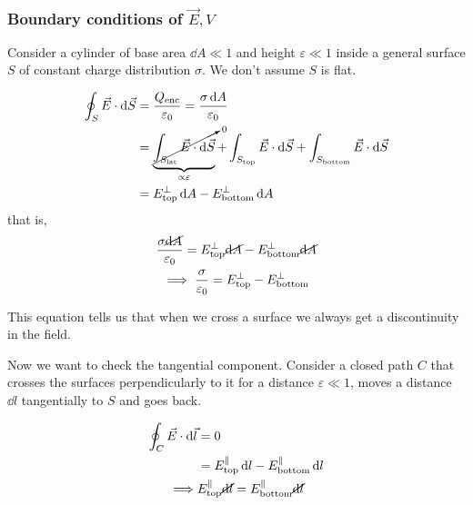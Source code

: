\documentclass[12pt]{extarticle}
\begin{document}
\subsubsection{Boundary conditions of \texorpdfstring{$\vec E, V$}{the electric field and the potential}}

Consider a cylinder of base area $\dd A \ll 1$ and height $ \varepsilon \ll 1$ inside a general surface $S$ of constant charge distribution $\sigma$.
We don't assume $S$ is flat.

\begin{align}
	\oint_S \vec E \cdot \dd{\vec S} & = \frac{Q_\text{enc}}{\varepsilon_0} = \frac{\sigma \dd{A}}{\varepsilon_0}                                                                                                                          \\
	                                 & = \underbrace{\cancelto{{}_0}{\int_{S_\text{lat}} \vec E \cdot \dd{\vec S}}}_{\propto \varepsilon} + \int_{S_\text{top}} \vec E \cdot \dd{\vec S} + \int_{S_\text{bottom}} \vec E \cdot \dd{\vec S} \\
	                                 & = E_\text{top}^\perp \dd{A} - E_\text{bottom}^\perp \dd{A}
\end{align}
that is,
\begin{gather}
	\frac{\sigma \cancel{\dd{A}}}{\varepsilon_0} = E_\text{top}^\perp \cancel{\dd{A}} - E_\text{bottom}^\perp \cancel{\dd{A}}\\
	\implies \frac{\sigma}{\varepsilon_0} = E_\text{top}^\perp - E_\text{bottom}^\perp
\end{gather}

This equation tells us that when we cross a surface we always get a discontinuity in the field.

Now we want to check the tangential component.
Consider a closed path $C$ that crosses the surfaces perpendicularly to it for a distance $\varepsilon \ll 1$, moves a distance $\dd{l}$ tangentially to $S$ and goes back.

\begin{align}
	\oint_C \vec E \cdot \dd{\vec l} & = 0                                                                                \\
	                                 & = E_\text{top}^\parallel \dd{l} - E_\text{bottom}^\parallel \dd{l}                 \\
	\implies                         & E_\text{top}^\parallel \cancel{\dd{l}} = E_\text{bottom}^\parallel \cancel{\dd{l}}
\end{align}
\end{document}
